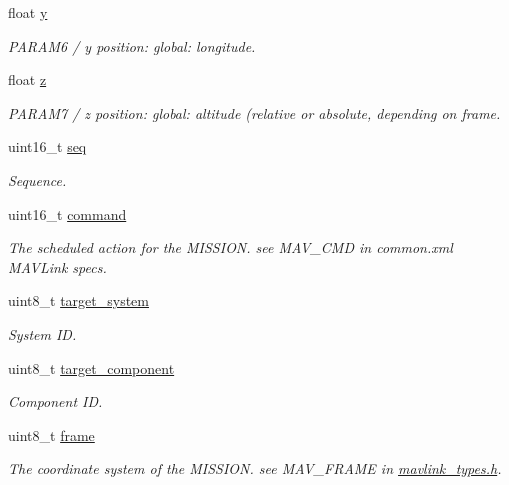 \begin{DoxyCompactItemize}
float \hyperlink{struct____mavlink__mission__item__t_a916e8ea61a94ce7b854ebd11cc5eea37}{y}
\begin{DoxyCompactList}\small\item\em P\+A\+R\+A\+M6 / y position\+: global\+: longitude. \end{DoxyCompactList}\item 
float \hyperlink{struct____mavlink__mission__item__t_adfa6844101b755c5e439b46f21ba0be8}{z}
\begin{DoxyCompactList}\small\item\em P\+A\+R\+A\+M7 / z position\+: global\+: altitude (relative or absolute, depending on frame. \end{DoxyCompactList}\item 
uint16\+\_\+t \hyperlink{struct____mavlink__mission__item__t_a0038a8dc2e0dc3757272b160a0cbaac2}{seq}
\begin{DoxyCompactList}\small\item\em Sequence. \end{DoxyCompactList}\item 
uint16\+\_\+t \hyperlink{struct____mavlink__mission__item__t_ad5a94a67caa147049e45c3754f15daa7}{command}
\begin{DoxyCompactList}\small\item\em The scheduled action for the M\+I\+S\+S\+I\+O\+N. see M\+A\+V\+\_\+\+C\+M\+D in common.\+xml M\+A\+V\+Link specs. \end{DoxyCompactList}\item 
uint8\+\_\+t \hyperlink{struct____mavlink__mission__item__t_ab6e5076aa5f0e524e88879bebf0ed483}{target\+\_\+system}
\begin{DoxyCompactList}\small\item\em System I\+D. \end{DoxyCompactList}\item 
uint8\+\_\+t \hyperlink{struct____mavlink__mission__item__t_a6bb8183ef3416741edca46337e6e6860}{target\+\_\+component}
\begin{DoxyCompactList}\small\item\em Component I\+D. \end{DoxyCompactList}\item 
uint8\+\_\+t \hyperlink{struct____mavlink__mission__item__t_aa3b25a65ef4d62f208ea6d3856b418cb}{frame}
\begin{DoxyCompactList}\small\item\em The coordinate system of the M\+I\+S\+S\+I\+O\+N. see M\+A\+V\+\_\+\+F\+R\+A\+M\+E in \hyperlink{mavlink__types_8h}{mavlink\+\_\+types.\+h}. \end{DoxyCompactList}\item 

\end{DoxyCompactItemize}
